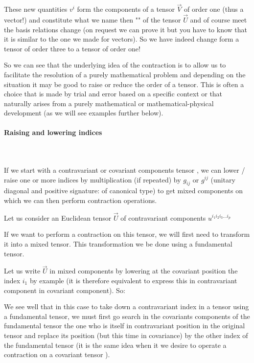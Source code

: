 	These new quantities $v^i$ form the components of a tensor $\vec{V}$ of order one (thus a vector!) and constitute what we name then "" of the tensor $\vec{U}$ and of course meet the basis relations change (on request we can prove it but you have to know that it is similar to the one we made for vectors). So we have indeed change form a tensor of order three to a tensor of order one!
	
	So we can see that the underlying idea of the contraction is to allow us to facilitate the resolution of a purely mathematical problem and depending on the situation it may be good  to raise or reduce the order of a tensor. This is often a choice that is made by trial and error based on a specific context or that naturally arises from a purely mathematical or mathematical-physical development (as we will see examples further below).

	\paragraph{Raising and lowering indices}\mbox{}\\\\
	If we start with a contravariant or covariant components tensor , we can lower / raise one or more indices by multiplication (if repeated) by $g_{ij}$ or $g^{ij}$ (unitary diagonal and positive signature: of canonical type) to get mixed components on which we can then perform contraction operations.
	
	Let us consider an Euclidean tensor $\vec{U}$ of contravariant components $u^{i_1i_2i_3\ldots i_p}$

	If we want to perform a contraction on this tensor, we will first need to transform it into a mixed tensor. This transformation we be done using a fundamental tensor.

	Let us write $\vec{U}$ in mixed components by lowering at the covariant position the index $i_1$ by example (it is therefore equivalent to express this in contravariant component in covariant component). So:
	
	We see well that in this case to take down a contravariant index in a tensor using a fundamental tensor, we must first go search in the covariants components of the fundamental tensor the one who is itself in contravariant position in the original tensor and replace its position (but this time in covariance) by the other index of the fundamental tensor (it is the same idea when it we desire to operate a contraction on a covariant tensor ).
	
